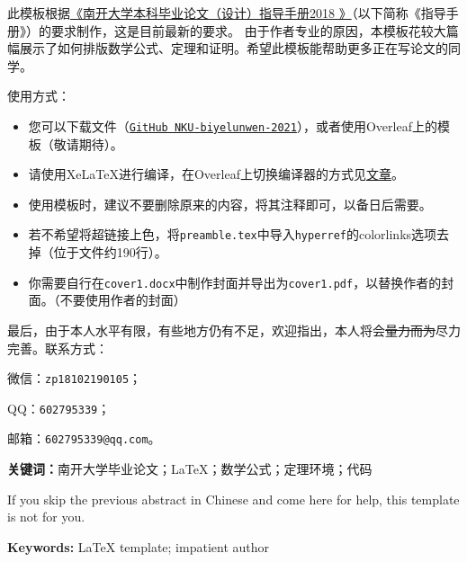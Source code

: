 \documentclass[zihao = -4, linespread = 1.5]{ctexart} %
\begin{document}
%

%
%
%
\begin{zhAbstract}
此模板根据\href{http://jwc.nankai.edu.cn/bylwwsjw/list.htm}{《南开大学本科毕业论文（设计）指导手册2018 》}（以下简称《指导手册》）的要求制作，这是目前最新的要求。
由于作者专业的原因，本模板花较大篇幅展示了如何排版数学公式、定理和证明。希望此模板能帮助更多正在写论文的同学。

使用方式：
\begin{itemize}
  \item 您可以下载文件（\href{https://github.com/skyline77/NKU-biyelunwen-2021}{\texttt{GitHub NKU-biyelunwen-2021}}），或者使用Overleaf上的模板（敬请期待）。
  \item 请使用XeLaTeX进行编译，在Overleaf上切换编译器的方式见\href{https://www.overleaf.com/learn/how-to/Changing_compiler}{文章}。
  \item 使用模板时，建议不要删除原来的内容，将其注释即可，以备日后需要。
  \item 若不希望将超链接上色，将\texttt{preamble.tex}中导入\texttt{hyperref}的colorlinks选项去掉（位于文件约190行）。
  \item 你需要自行在\texttt{cover1.docx}中制作封面并导出为\texttt{cover1.pdf}，以替换作者的封面。（不要使用作者的封面\blacksmiley{}）
\end{itemize}

最后，由于本人水平有限，有些地方仍有不足，欢迎指出，本人将会\sout{量力而为}尽力完善。联系方式：
\begin{enumerate*}[label=(\arabic*)]
   \item 微信：\texttt{zp18102190105}；
  \item QQ：\texttt{602795339}；
  \item 邮箱：\texttt{602795339@qq.com}。
\end{enumerate*}
\par\noindent\textbf{关键词：}南开大学毕业论文；\LaTeX；数学公式；定理环境；代码
\end{zhAbstract}

\begin{enAbstract}
If you skip the previous abstract in Chinese and come here for help, this template is not for you\smiley{}.
\par\noindent\textbf{Keywords: }\LaTeX{} template; impatient author
\end{enAbstract}
\end{document}
